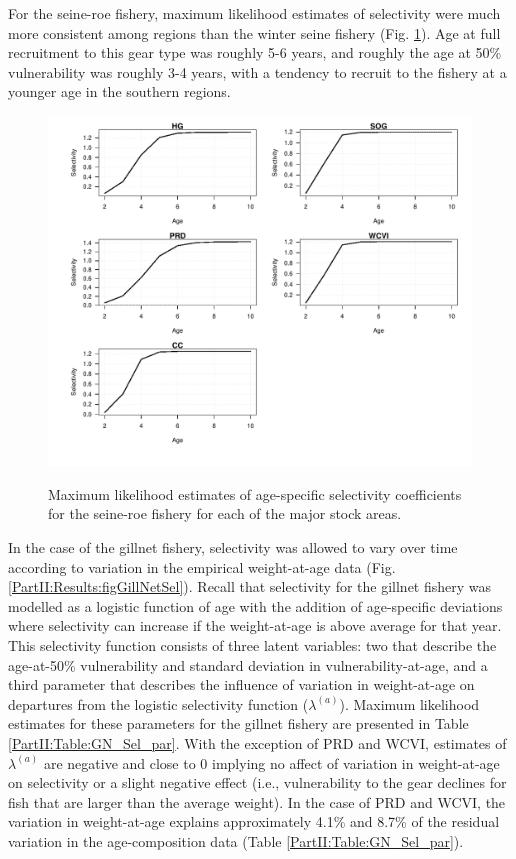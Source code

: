 For the seine-roe fishery, maximum likelihood estimates of selectivity were much more consistent among regions than the winter seine fishery (Fig. \ref{PartII:Results:figSeineRoeSel}).  Age at full recruitment to this gear type was roughly 5-6 years, and roughly the age at 50\% vulnerability was roughly 3-4 years, with a tendency to recruit to the fishery at a younger age in the southern regions.

\begin{figure}[!tbp]
	\includegraphics[width=\textwidth]{../FIGS/qPriorFigs/iscam_fig_sel2d_seine_roe_sel.pdf}\\
	\caption{Maximum likelihood estimates of age-specific selectivity coefficients for the seine-roe fishery for each of the major stock areas.}\label{PartII:Results:figSeineRoeSel}
\end{figure}

In the case of the gillnet fishery, selectivity was allowed to vary over time according to variation in the empirical weight-at-age data (Fig. \ref{PartII:Results:figGillNetSel}).  Recall that selectivity for the gillnet fishery was modelled as a logistic function of age with the addition of age-specific deviations where selectivity can increase if the weight-at-age is above average for that year.  This selectivity function consists of three latent variables: two that describe the age-at-50\% vulnerability and standard deviation in vulnerability-at-age, and a third parameter that describes the influence of variation in weight-at-age on departures from the logistic selectivity function ($\lambda^{(a)}$).  Maximum likelihood estimates for these parameters for the gillnet fishery are presented in Table \ref{PartII:Table:GN_Sel_par}.  With the exception of PRD and WCVI, estimates of $\lambda^{(a)}$ are negative and close to 0 implying no affect of variation in weight-at-age on selectivity or a slight negative effect (i.e., vulnerability to the gear declines for fish that are larger than the average weight).  In the case of PRD and WCVI, the variation in weight-at-age explains approximately 4.1\% and 8.7\% of the residual variation in the age-composition data (Table \ref{PartII:Table:GN_Sel_par}).

